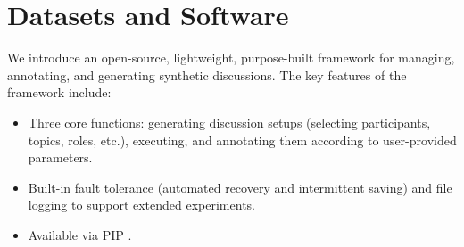 \section{Datasets and Software}
\label{sec:data-soft}

We introduce \syndisco\syndiscolink an open-source, lightweight, purpose-built framework for managing, annotating, and generating synthetic discussions. The key features of the framework include: 
\begin{itemize}[nosep, noitemsep]
    \item Three core functions: generating discussion setups (selecting participants, topics, roles, etc.), executing, and annotating them according to user-provided parameters.
    \item  Built-in fault tolerance (automated recovery and intermittent saving) and file logging to support extended experiments.
    \item Available via PIP \pip.
\end{itemize}
